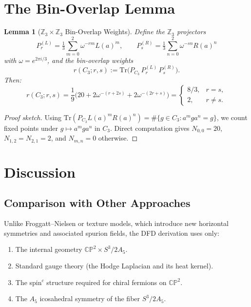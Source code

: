 \documentclass[11pt,a4paper]{article}
\newcommand{\CP}{\mathbb{CP}}
\newcommand{\Z}{\mathbb{Z}}
\newcommand{\Tr}{\mathrm{Tr}}
\newtheorem{lemma}[theorem]{Lemma}
\theoremstyle{remark}
\begin{document}
\section{The Bin-Overlap Lemma}
\label{sec:bin-overlap}

\begin{lemma}[$\Z_3 \times \Z_3$ Bin-Overlap Weights]
\label{lem:bin}
Define the $\Z_3$ projectors
\[
P_r^{(L)} = \tfrac{1}{3}\sum_{m=0}^{2} \omega^{-rm} L(a)^m, \qquad
P_s^{(R)} = \tfrac{1}{3}\sum_{n=0}^{2} \omega^{-sn} R(a)^n
\]
with $\omega = e^{2\pi i/3}$, and the bin-overlap weights
\[
r(C_3; r, s) := \Tr\!\big(P_{C_3}\, P_r^{(L)}\, P_s^{(R)}\big).
\]
Then:
\begin{equation}
\boxed{\quad r(C_3; r, s) = \frac{1}{9}\Big(20 + 2\omega^{-(r+2s)} + 2\omega^{-(2r+s)}\Big)
= \begin{cases} 8/3, & r = s, \\ 2, & r \neq s. \end{cases}\quad}
\label{eq:bin-overlap}
\end{equation}
\end{lemma}

\begin{proof}[Proof sketch]
Using $\Tr(P_{C_3} L(a)^m R(a)^n) = \#\{g \in C_3 : a^m g a^n = g\}$, we count
fixed points under $g \mapsto a^m g a^n$ in $C_3$.  Direct computation gives
$N_{0,0} = 20$, $N_{1,2} = N_{2,1} = 2$, and $N_{m,n} = 0$ otherwise.
\end{proof}


\section{Discussion}
\label{sec:discussion}

\subsection{Comparison with Other Approaches}

Unlike Froggatt--Nielsen or texture models, which introduce new horizontal
symmetries and associated spurion fields, the DFD derivation uses only:
\begin{enumerate}
\item The internal geometry $\CP^2 \times S^3/2A_5$.
\item Standard gauge theory (the Hodge Laplacian and its heat kernel).
\item The spin$^c$ structure required for chiral fermions on $\CP^2$.
\item The $A_5$ icosahedral symmetry of the fiber $S^3/2A_5$.
\end{enumerate}
\end{document}
